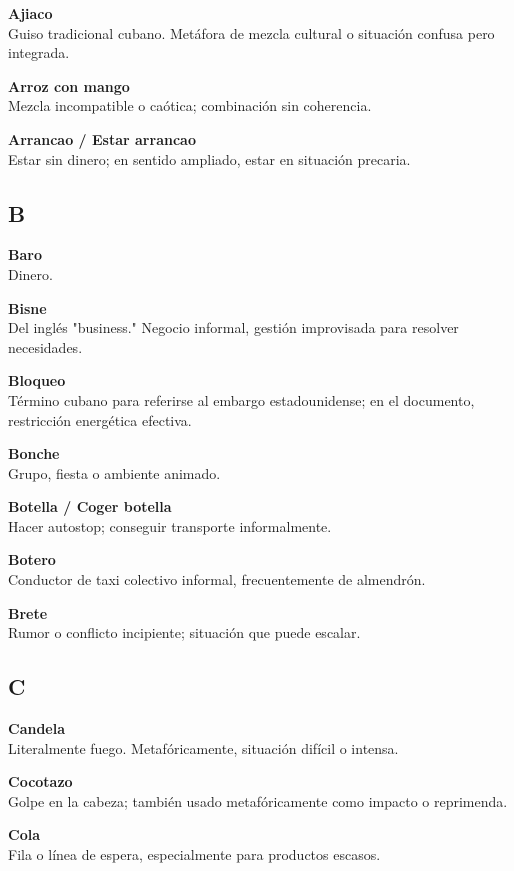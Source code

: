 \documentclass[12pt]{article}
\begin{document}
\textbf{Ajiaco}\\
Guiso tradicional cubano. Metáfora de mezcla cultural o situación confusa pero integrada.

\textbf{Arroz con mango}\\
Mezcla incompatible o caótica; combinación sin coherencia.

\textbf{Arrancao / Estar arrancao}\\
Estar sin dinero; en sentido ampliado, estar en situación precaria.

\subsection*{B}

\textbf{Baro}\\
Dinero.

\textbf{Bisne}\\
Del inglés "business." Negocio informal, gestión improvisada para resolver necesidades.

\textbf{Bloqueo}\\
Término cubano para referirse al embargo estadounidense; en el documento, restricción energética efectiva.

\textbf{Bonche}\\
Grupo, fiesta o ambiente animado.

\textbf{Botella / Coger botella}\\
Hacer autostop; conseguir transporte informalmente.

\textbf{Botero}\\
Conductor de taxi colectivo informal, frecuentemente de almendrón.

\textbf{Brete}\\
Rumor o conflicto incipiente; situación que puede escalar.

\subsection*{C}

\textbf{Candela}\\
Literalmente fuego. Metafóricamente, situación difícil o intensa.

\textbf{Cocotazo}\\
Golpe en la cabeza; también usado metafóricamente como impacto o reprimenda.

\textbf{Cola}\\
Fila o línea de espera, especialmente para productos escasos.
\end{document}
